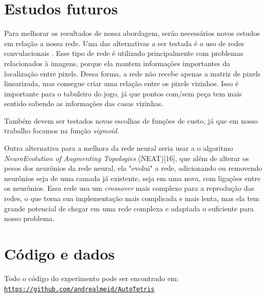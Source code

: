 \documentclass[conference]{IEEEtran}
\begin{document}
\section{Estudos futuros}
Para melhorar os resultados de nossa abordagem, serão necessários novos estudos em relação a nossa rede. Uma das alternativas a ser testada é o uso de redes convulacionais \cite{b15}. Esse tipo de rede é utilizado principalmente com problemas relacionados à imagens, porque ela mantem informações importantes da localização entre pixels. Dessa forma, a rede não recebe apenas a matriz de pixels linearizada, mas consegue criar uma relação entre os pixels vizinhos. Isso é importante para o tabuleiro do jogo, já que pontos com/sem peça tem mais sentido sabendo as informações das casas vizinhas.

Também devem ser testados novas escolhas de funções de custo, já que em nosso trabalho focamos na função \textit{sigmoid}.

Outra alternativa para a melhora da rede neural seria usar a o algoritmo \textit{NeuroEvolution of Augmenting Topologies} (NEAT)[16], que além de alterar os pesos dos neurônios da rede neural, ela "evolui" a rede, adicionando ou removendo neurônios seja de uma camada já existente, seja em uma nova, com ligações entre os neurônios. Essa rede usa um \textit{crossover} mais complexo para a reprodução das redes, o que torna sua implementação mais complicada e mais lenta, mas ela tem grande potencial de chegar em uma rede complexa e adaptada o suficiente para nosso problema.

\section{Código e dados}
Todo o código do experimento pode ser encontrado em:\\
 \texttt{\url{https://github.com/andrealmeid/AutoTetris}}
\end{document}
